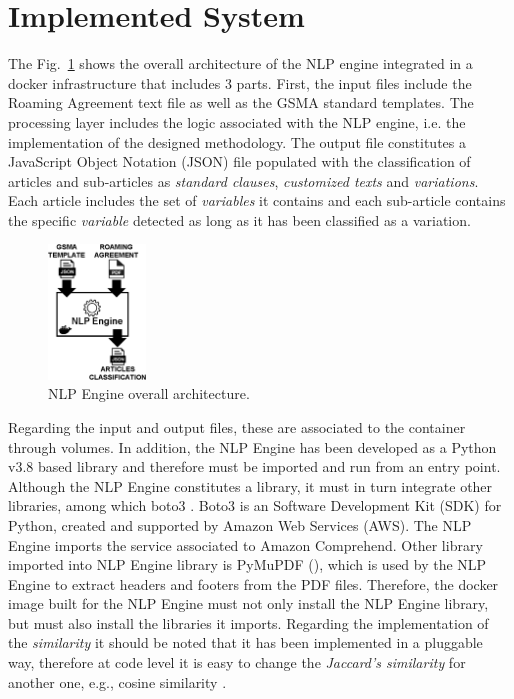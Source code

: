 \documentclass[conference]{style/IEEEtran}
\begin{document}
\section{Implemented System}
The Fig.~\ref{fig2} shows the overall architecture of the NLP engine integrated in a docker infrastructure that includes 3 parts. First, the input files include the Roaming Agreement text file as well as the GSMA standard templates. The processing layer includes the logic associated with the NLP engine, i.e. the implementation of the designed methodology. The output file constitutes a JavaScript Object Notation (JSON) file populated with the classification of articles and sub-articles as \textit{standard clauses}, \textit{customized texts} and \textit{variations}. Each article includes the set of \textit{variables} it contains and each sub-article contains the specific \textit{variable} detected as long as it has been classified as a variation.

\begin{figure}[htbp]
\centerline{\includegraphics[width=0.23\textwidth]{images/NLP_Engine.png}}
\caption{NLP Engine overall architecture.}
\label{fig2}
\end{figure}

Regarding the input and output files, these are associated to the container through volumes. In addition, the NLP Engine has been developed as a Python v3.8 based library and therefore must be imported and run from an entry point. Although the NLP Engine constitutes a library, it must in turn integrate other libraries, among which boto3 \cite{boto3}. Boto3 is an Software Development Kit (SDK) for Python, created and supported by Amazon Web Services (AWS). The NLP Engine imports the service associated to Amazon Comprehend. Other library imported into NLP Engine library is PyMuPDF (\cite{PyMuPDF}), which is used by the NLP Engine to extract headers and footers from the PDF files. Therefore, the docker image built for the NLP Engine must not only install the NLP Engine library, but must also install the libraries it imports. Regarding the implementation of the \textit{similarity} it should be noted that it has been implemented in a pluggable way, therefore at code level it is easy to change the \textit{Jaccard's similarity} for another one, e.g., cosine similarity \cite{Gupta2018}.
\end{document}
